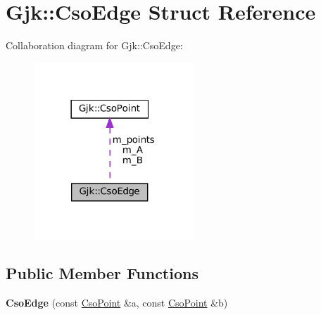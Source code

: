 \hypertarget{structGjk_1_1CsoEdge}{}\section{Gjk\+:\+:Cso\+Edge Struct Reference}
\label{structGjk_1_1CsoEdge}


Collaboration diagram for Gjk\+:\+:Cso\+Edge\+:\nopagebreak
\begin{figure}[H]
\begin{center}
\leavevmode
\includegraphics[width=170pt]{structGjk_1_1CsoEdge__coll__graph}
\end{center}
\end{figure}
\subsection*{Public Member Functions}
\begin{DoxyCompactItemize}
\item 
\mbox{\label{structGjk_1_1CsoEdge_a8d9009b6a3943c070c62bbc826d5a83b}} 
{\bfseries Cso\+Edge} (const \hyperlink{structGjk_1_1CsoPoint}{Cso\+Point} \&a, const \hyperlink{structGjk_1_1CsoPoint}{Cso\+Point} \&b)
\end{DoxyCompactItemize}
